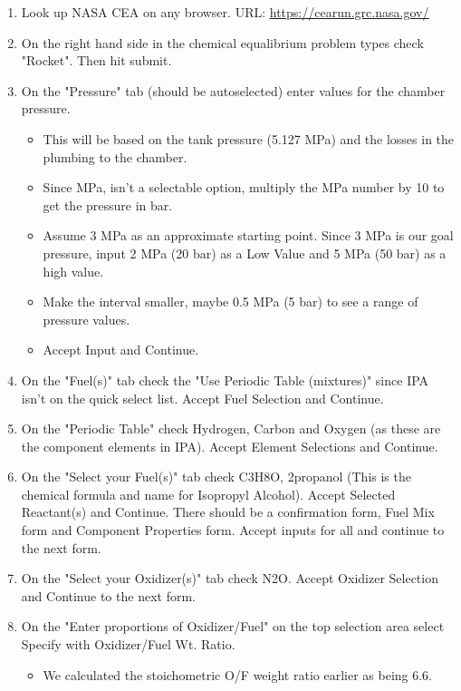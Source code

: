 \documentclass[12pt, letter paper]{article}
\begin{document}
				\begin{enumerate}
					\item Look up NASA CEA on any browser. URL: \href{https://cearun.grc.nasa.gov/}{\underline{https://cearun.grc.nasa.gov/}}
					\item On the right hand side in the chemical equalibrium problem types check "Rocket". Then hit submit.
					\item On the "Pressure" tab (should be autoselected) enter values for the chamber pressure. 
						\begin{itemize}
							\item This will be based on the tank pressure (5.127 MPa) and the losses in the plumbing to the chamber. 
							\item Since MPa, isn't a selectable option, multiply the MPa number by 10 to get the pressure in bar.
							\item Assume 3 MPa as an approximate starting point. Since 3 MPa is our goal pressure, input 2 MPa (20 bar) as a Low Value and 5 MPa (50 bar) as a high value. 
							\item Make the interval smaller, maybe 0.5 MPa (5 bar) to see a range of pressure values. 
							\item Accept Input and Continue.
						\end{itemize}
					\item On the "Fuel(s)" tab check the "Use Periodic Table (mixtures)" since IPA isn't on the quick select list. Accept Fuel Selection and Continue.
					\item On the "Periodic Table" check Hydrogen, Carbon and Oxygen (as these are the component elements in IPA). Accept Element Selections and Continue.
					\item On the "Select your Fuel(s)" tab check C3H8O, 2propanol (This is the chemical formula and name for Isopropyl Alcohol). Accept Selected Reactant(s) and Continue. 
						There should be a confirmation form, Fuel Mix form and Component Properties form. Accept inputs for all and continue to the next form.
					\item On the "Select your Oxidizer(s)" tab check N2O. Accept Oxidizer Selection and Continue to the next form.
					\item On the "Enter proportions of Oxidizer/Fuel" on the top selection area select Specify with Oxidizer/Fuel Wt. Ratio. 
						\begin{itemize}
							\item We calculated the stoichometric O/F weight ratio earlier as being 6.6. 

\end{itemize}
\end{enumerate}
\end{document}
